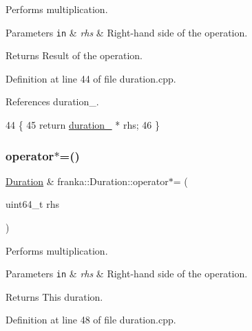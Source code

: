 Performs multiplication.


\begin{DoxyParams}[1]{Parameters}
\mbox{\tt in}  & {\em rhs} & Right-\/hand side of the operation.\\
\hline
\end{DoxyParams}
\begin{DoxyReturn}{Returns}
Result of the operation. 
\end{DoxyReturn}


Definition at line 44 of file duration.\+cpp.



References duration\+\_\+.


\begin{DoxyCode}
44                                                         \{
45   \textcolor{keywordflow}{return} \hyperlink{classfranka_1_1Duration_ae446c403b200f0dbf92fb51ca21e82ff}{duration\_} * rhs;
46 \}
\end{DoxyCode}
\mbox{\label{classfranka_1_1Duration_a0cfaeaa7e3c5b2de334a79732c24cd54}} 
\subsubsection{\texorpdfstring{operator$\ast$=()}{operator*=()}}
{\footnotesize\ttfamily \hyperlink{classfranka_1_1Duration}{Duration} \& franka\+::\+Duration\+::operator$\ast$= (\begin{DoxyParamCaption}\item[{uint64\+\_\+t}]{rhs }\end{DoxyParamCaption})\hspace{0.3cm}{\ttfamily [noexcept]}}

Performs multiplication.


\begin{DoxyParams}[1]{Parameters}
\mbox{\tt in}  & {\em rhs} & Right-\/hand side of the operation.\\
\hline
\end{DoxyParams}
\begin{DoxyReturn}{Returns}
This duration. 
\end{DoxyReturn}


Definition at line 48 of file duration.\+cpp.




